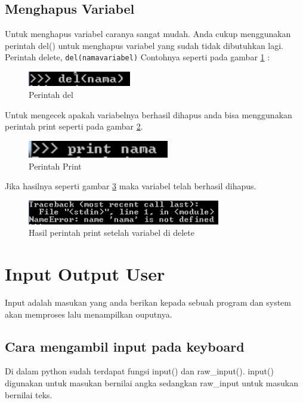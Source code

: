 \subsection{Menghapus Variabel}
Untuk menghapus variabel caranya sangat mudah. Anda cukup menggunakan perintah del() untuk menghapus variabel yang sudah tidak dibutuhkan lagi. Perintah delete, \verb|del(namavariabel)|
Contohnya seperti pada gambar \ref{fig:perintahdel} :
\begin{figure}[!htbp]
	\centerline{\includegraphics[width=0.40\textwidth]{figures/2/perintahdel.PNG}}
	\caption{Perintah del}
	\label{fig:perintahdel}
\end{figure}

Untuk mengecek apakah variabelnya berhasil dihapus anda bisa menggunakan perintah print seperti pada gambar \ref{fig:perintahprint}. 
\begin{figure}[!htbp]
	\centerline{\includegraphics[width=0.55\textwidth]{figures/2/perintahprint.PNG}}
	\caption{Perintah Print}
	\label{fig:perintahprint}
\end{figure}

Jika hasilnya seperti gambar \ref{fig:afterdelete} maka variabel telah berhasil dihapus.
\begin{figure}[!htbp]
	\centerline{\includegraphics[width=0.75\textwidth]{figures/2/afterdelete.PNG}}
	\caption{Hasil perintah print setelah variabel di delete}
	\label{fig:afterdelete}
\end{figure}

\section{Input Output User}
Input adalah masukan yang anda berikan kepada sebuah program dan system akan memproses lalu menampilkan ouputnya.

\subsection{Cara mengambil input pada keyboard}
Di dalam python sudah terdapat fungsi input() dan raw\_input(). input() digunakan untuk masukan bernilai angka sedangkan raw\_input untuk masukan bernilai teks.

